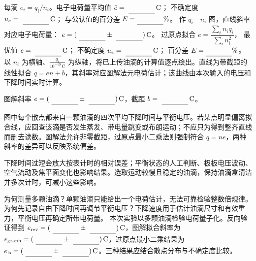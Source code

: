 \noindent 每滴 $e_i=q_i/n_i$。电子电荷量平均值
$\bar e=\MathField{electron_charge_reverse}\,\mathrm C$；
不确定度 $u_e=\MathField{electron_charge_reverse_u}\,\mathrm C$；
与公认值的百分差 $E=\Field{reverse_error_percent}\%$。
\noindent 作 $q_i$—$n_i$ 图，直线斜率对应电子电荷量：
$e=(\MathField{electron_charge_graph}\pm\MathField{electron_charge_graph_u})\,\mathrm C$。
\noindent 过原点拟合 $e=\dfrac{\sum_i n_iq_i}{\sum_i n_i^2}$，
最优值 $e=\MathField{electron_charge_ls}\,\mathrm C$；
不确定度 $u_e=\MathField{electron_charge_ls_u}\,\mathrm C$；
百分差 $E=\Field{ls_error_percent}\%$。
以 $n_i$ 为横轴、$\frac{q_i}{10^{-19}\,\mathrm C}$ 为纵轴，将已上传油滴的计算值逐点绘出。直线为带截距的线性拟合 $q=en+b$，其斜率对应图解法元电荷估计；该曲线由本次输入的电压和下降时间实时计算。
\begin{center}\par
{\small 图解斜率 $e=(\MathField{electron_charge_graph}\pm\MathField{electron_charge_graph_u})\,\mathrm C$，截距 $b=\MathField{electron_charge_graph_intercept}\,\mathrm C$。}
\end{center}
图中每个散点都来自一颗油滴的四次平均下降时间与平衡电压。若某点明显偏离拟合线，应回查该滴是否发生蒸发、带电量跳变或布朗运动；不应只为得到整齐直线而删去读数。图解法允许非零截距，过原点最小二乘法则强制符合 $q=ne$，两种斜率的差异可以反映系统偏差。\par
{}
下降时间过短会放大按表计时的相对误差；平衡状态的人工判断、极板电压波动、空气流动及焦平面变化也影响结果。选取运动较慢且稳定的油滴，保持油滴盒清洁并多次计时，可减小这些影响。\par
{}
为何测量多颗油滴？单颗油滴只能给出一个电荷估计，无法可靠检验整数倍规律。为何先记录自由下降时间再调节平衡电压？下降速度用于估计油滴尺寸和有效重力，平衡电压再确定所带电荷量。
本次实验以多颗油滴检验电荷量子化。反向验证得到 $e_{\rm rev}=(\MathField{electron_charge_reverse}\pm\MathField{electron_charge_reverse_u})\,\mathrm C$，图解拟合斜率为 $e_{\rm graph}=(\MathField{electron_charge_graph}\pm\MathField{electron_charge_graph_u})\,\mathrm C$，过原点最小二乘结果为 $e_{\rm ls}=(\MathField{electron_charge_ls}\pm\MathField{electron_charge_ls_u})\,\mathrm C$。三种结果应结合散点分布与不确定度比较。

\ReportRecord

